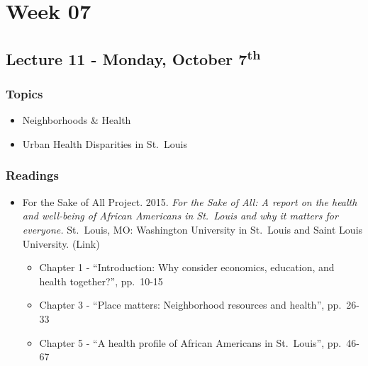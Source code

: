 \documentclass[]{book}
\providecommand{\tightlist}{%
  \setlength{\itemsep}{0pt}\setlength{\parskip}{0pt}}
\begin{document}
\hypertarget{week-07}{%
\section*{Week 07}\label{week-07}}

\hypertarget{lecture-11---monday-october-7th}{%
\subsection*{\texorpdfstring{Lecture 11 - Monday, October 7\textsuperscript{th}}{Lecture 11 - Monday, October 7th}}\label{lecture-11---monday-october-7th}}

\hypertarget{topics-12}{%
\subsubsection*{Topics}\label{topics-12}}

\begin{itemize}
\tightlist
\item
  Neighborhoods \& Health
\item
  Urban Health Disparities in St.~Louis
\end{itemize}

\hypertarget{readings-11}{%
\subsubsection*{Readings}\label{readings-11}}

\begin{itemize}
\tightlist
\item
  For the Sake of All Project. 2015. \emph{For the Sake of All: A report on the health and well-being of African Americans in St.~Louis and why it matters for everyone.} St.~Louis, MO: Washington University in St.~Louis and Saint Louis University. (Link)

  \begin{itemize}
  \tightlist
  \item
    Chapter 1 - ``Introduction: Why consider economics, education, and health together?'', pp.~10-15
  \item
    Chapter 3 - ``Place matters: Neighborhood resources and health'', pp.~26-33
  \item
    Chapter 5 - ``A health profile of African Americans in St.~Louis'', pp.~46-67
  \end{itemize}
\end{itemize}
\end{document}
